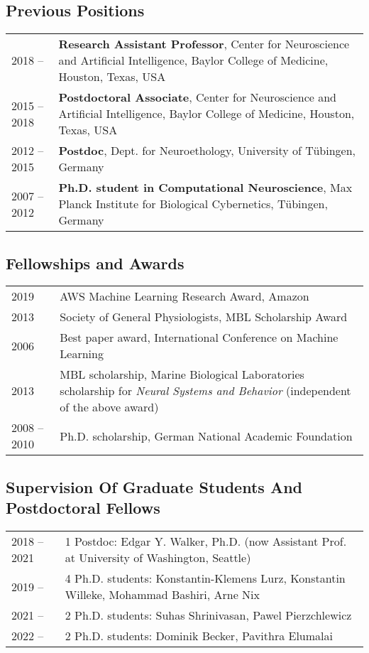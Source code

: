 \documentclass[COG,11pt]{ercgrant}
\begin{document}
\subsection{Previous Positions}
\begin{tabular}{p{3cm}p{12cm}}
    2018 -- 
      & \textbf{Research Assistant Professor},
       Center for Neuroscience and Artificial Intelligence, 
       Baylor College of Medicine, Houston, Texas, USA\\
    2015 -- 2018 
      & \textbf{Postdoctoral Associate},
       Center for Neuroscience and Artificial Intelligence,
       Baylor College of Medicine, Houston, Texas, USA\\
    2012 -- 2015 
      & \textbf{Postdoc},
       Dept. for Neuroethology, 
       University of Tübingen, Germany\\
    2007 -- 2012 
      & \textbf{Ph.D. student in Computational Neuroscience}, Max Planck Institute for Biological Cybernetics, Tübingen, Germany\\
\end{tabular}
\color{black}

\subsection{Fellowships and Awards}
\begin{tabular}{p{3cm}p{12cm}}
2019 & AWS Machine Learning Research Award, Amazon\\
2013 & Society of General Physiologists, MBL Scholarship Award\\
2006 & Best paper award, International Conference on Machine Learning\\
2013 & MBL scholarship, Marine Biological Laboratories
  scholarship for {\em Neural Systems and Behavior} (independent of the above award)\\
2008 -- 2010 & Ph.D. scholarship, German National Academic Foundation
\end{tabular}

\subsection{Supervision Of Graduate Students And Postdoctoral Fellows}
\begin{tabular}{p{3cm}p{12cm}}
2018 -- 2021 & 1 Postdoc: Edgar Y. Walker, Ph.D. (now Assistant Prof. at University of Washington, Seattle)\\
2019 -- & 4 Ph.D. students: Konstantin-Klemens Lurz, Konstantin Willeke, Mohammad Bashiri, Arne Nix\\
2021 -- & 2 Ph.D. students: Suhas Shrinivasan, Pawel Pierzchlewicz\\
2022 -- & 2 Ph.D. students: Dominik Becker, Pavithra Elumalai
\end{tabular}
\end{document}
